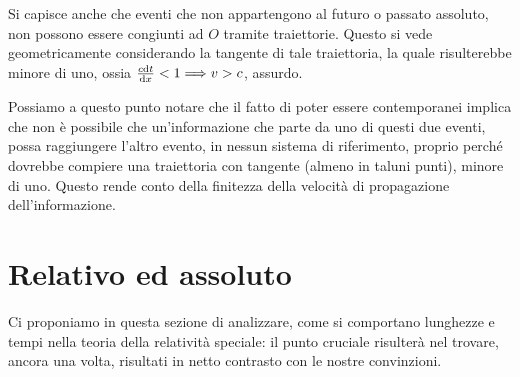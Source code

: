 Si capisce anche che eventi che non appartengono al futuro o passato
assoluto, non possono essere congiunti ad $O$ tramite traiettorie.
Questo si vede geometricamente considerando la tangente di tale
traiettoria, la quale risulterebbe minore di uno, ossia $ \frac{ c \mathrm{d}
  t }{ \mathrm{d} x} < 1 \Longrightarrow v > c$, assurdo.

\begin{osservazione}
  Possiamo a questo punto notare che il fatto di poter essere
  contemporanei implica che non \`e possibile che un'informazione che
  parte da uno di questi due eventi, possa raggiungere l'altro evento,
  in nessun sistema di riferimento, proprio perch\'e dovrebbe compiere
  una traiettoria con tangente (almeno in taluni punti), minore di
  uno. Questo rende conto della finitezza della velocit\`a di
  propagazione dell'informazione.
\end{osservazione}
\section{Relativo ed assoluto}
Ci proponiamo in questa sezione di analizzare, %
come si comportano lunghezze e tempi nella teoria della relativit\`a
speciale: il punto cruciale risulter\`a nel trovare, ancora una volta,
risultati in netto contrasto con le nostre convinzioni.

